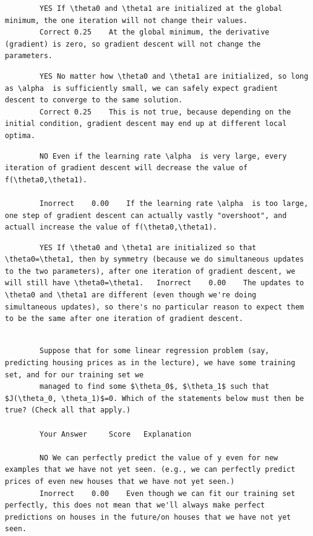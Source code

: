 \documentclass[11pt]{article} %
\begin{document}
		\begin{verbatim}
		YES If \theta0 and \theta1 are initialized at the global minimum, the one iteration will not change their values.	
		Correct	0.25	At the global minimum, the derivative (gradient) is zero, so gradient descent will not change the parameters.
		\end{verbatim}
		
		\begin{verbatim}
		YES No matter how \theta0 and \theta1 are initialized, so long as \alpha  is sufficiently small, we can safely expect gradient descent to converge to the same solution.	
		Correct	0.25	This is not true, because depending on the initial condition, gradient descent may end up at different local optima.
		\end{verbatim}
		
		\begin{verbatim}
		NO Even if the learning rate \alpha  is very large, every iteration of gradient descent will decrease the value of f(\theta0,\theta1).	
		
		Inorrect	0.00	If the learning rate \alpha  is too large, one step of gradient descent can actually vastly "overshoot", and actuall increase the value of f(\theta0,\theta1).
		\end{verbatim}
		
		\begin{verbatim}
		YES If \theta0 and \theta1 are initialized so that \theta0=\theta1, then by symmetry (because we do simultaneous updates to the two parameters), after one iteration of gradient descent, we will still have \theta0=\theta1.	Inorrect	0.00	The updates to \theta0 and \theta1 are different (even though we're doing simultaneous updates), so there's no particular reason to expect them to be the same after one iteration of gradient descent.
		\end{verbatim}
		
		\begin{verbatim}
		
		Suppose that for some linear regression problem (say, predicting housing prices as in the lecture), we have some training set, and for our training set we 
		managed to find some $\theta_0$, $\theta_1$ such that $J(\theta_0, \theta_1)$=0. Which of the statements below must then be true? (Check all that apply.)
		
		Your Answer		Score	Explanation
		
		NO We can perfectly predict the value of y even for new examples that we have not yet seen. (e.g., we can perfectly predict prices of even new houses that we have not yet seen.)	
		Inorrect	0.00	Even though we can fit our training set perfectly, this does not mean that we'll always make perfect predictions on houses in the future/on houses that we have not yet seen.
		\end{verbatim}
		
\end{document}
